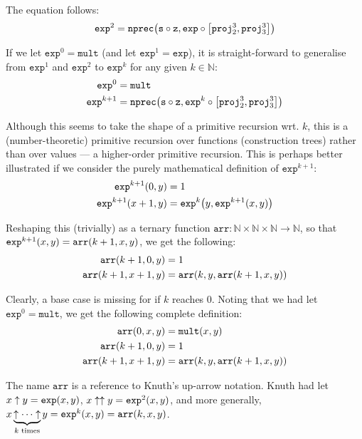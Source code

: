 The equation follows:\begin{align*}
%
\mathtt{exp}^2 = \mathtt{nprec}\p{\mathtt{s} \circ \mathtt{z}, \mathtt{exp}
\circ \seq{\mathtt{proj}^3_2, \mathtt{proj}^3_3}}
%
\end{align*}

If we let $\mathtt{exp}^0 = \mathtt{mult}$ (and let $\mathtt{exp}^1 =
\mathtt{exp}$), it is straight-forward to generalise from $\mathtt{exp}^1$ and
$\mathtt{exp}^2$ to $\mathtt{exp}^k$ for any given $k \in
\mathbb{N}$:\begin{align*}
%
\mathtt{exp}^0 &= \mathtt{mult} \\
%
\mathtt{exp}^{k+1} &= \mathtt{nprec}\p{\mathtt{s} \circ \mathtt{z},
\mathtt{exp}^k \circ \seq{\mathtt{proj}^3_2, \mathtt{proj}^3_3}}
%
\end{align*}

Although this seems to take the shape of a primitive recursion wrt. $k$, this
is a (number-theoretic) primitive recursion over functions (construction trees)
rather than over values --- a higher-order primitive recursion. This is perhaps
better illustrated if we consider the purely mathematical definition of
$\mathtt{exp}^{k+1}$:\begin{align*}
%
\mathtt{exp}^{k+1}\p{0,y} &= 1 \\
%
\mathtt{exp}^{k+1}\p{x+1,y} &= \mathtt{exp}^k\p{y,\mathtt{exp}^{k+1}\p{x,y}}
%
\end{align*}

Reshaping this (trivially) as a ternary function $\mathtt{arr} : \mathbb{N}
\times \mathbb{N} \times \mathbb{N} \rightarrow \mathbb{N}$, so that
$\mathtt{exp}^{k+1}{\mathopen{}\left({x,y}\right)\mathclose{}} = \mathtt{arr}{\mathopen{}\left({k+1,x,y}\right)\mathclose{}}$, we get the
following:\begin{align*}
%
\mathtt{arr}\p{k+1, 0,y} &= 1 \\
%
\mathtt{arr}\p{k+1,x+1,y} &= \mathtt{arr}\p{k,y,\mathtt{arr}\p{k+1,x,y}}
%
\end{align*}

Clearly, a base case is missing for if $k$ reaches $0$.  Noting that we had let
$\mathtt{exp}^0 = \mathtt{mult}$, we get the following complete
definition:\begin{align*}
%
\mathtt{arr}\p{0,x,y} &= \mathtt{mult}\p{x,y} \\
%
\mathtt{arr}\p{k+1, 0,y} &= 1 \\
%
\mathtt{arr}\p{k+1,x+1,y} &= \mathtt{arr}\p{k,y,\mathtt{arr}\p{k+1,x,y}}
%
\end{align*}

\begin{remark} The name $\mathtt{arr}$ is a reference to Knuth's up-arrow
notation\cite{knuth-1976}. Knuth had let $x \uparrow y = \mathtt{exp}{\mathopen{}\left({x,y}\right)\mathclose{}}$,
$x \uparrow \uparrow y = \mathtt{exp}^2{\mathopen{}\left({x,y}\right)\mathclose{}}$, and more generally, $x
\underbrace{\uparrow \cdots \uparrow}_{\text{$k$ times}} y =
\mathtt{exp}^k{\mathopen{}\left({x,y}\right)\mathclose{}} = \mathtt{arr}{\mathopen{}\left({k,x,y}\right)\mathclose{}}$. \end{remark}

